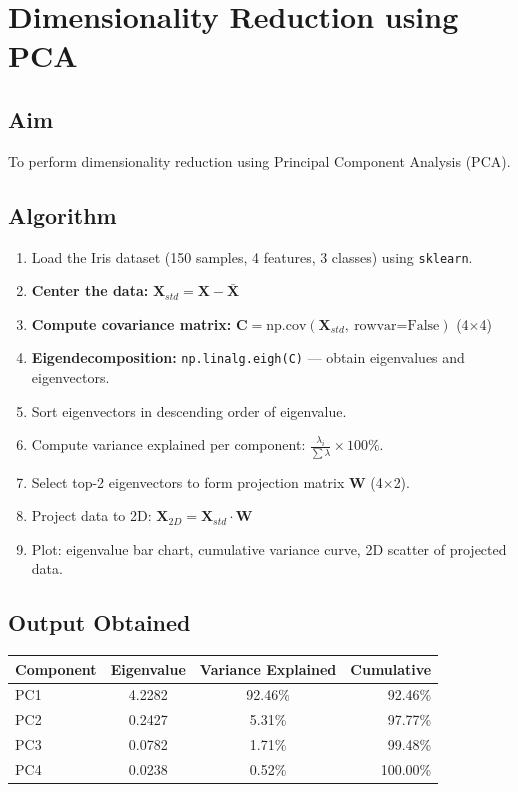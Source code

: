 \documentclass[12pt,a4paper]{article}
\begin{document}
\newpage

\section{Dimensionality Reduction using PCA}

\subsection*{Aim}
To perform dimensionality reduction using Principal Component Analysis (PCA).

\subsection*{Algorithm}
\begin{enumerate}[leftmargin=*, label=\arabic*.]
  \item Load the Iris dataset (150 samples, 4 features, 3 classes) using \texttt{sklearn}.
  \item \textbf{Center the data:} $\mathbf{X}_{std} = \mathbf{X} - \bar{\mathbf{X}}$
  \item \textbf{Compute covariance matrix:} $\mathbf{C} = \text{np.cov}(\mathbf{X}_{std},\ \text{rowvar=False})$ \quad (4$\times$4)
  \item \textbf{Eigendecomposition:} \texttt{np.linalg.eigh(C)} --- obtain eigenvalues and eigenvectors.
  \item Sort eigenvectors in descending order of eigenvalue.
  \item Compute variance explained per component: $\frac{\lambda_i}{\sum \lambda} \times 100\%$.
  \item Select top-2 eigenvectors to form projection matrix $\mathbf{W}$ (4$\times$2).
  \item Project data to 2D: $\mathbf{X}_{2D} = \mathbf{X}_{std} \cdot \mathbf{W}$
  \item Plot: eigenvalue bar chart, cumulative variance curve, 2D scatter of projected data.
\end{enumerate}

\subsection*{Output Obtained}

\begin{center}
\begin{tabular}{lccr}
\toprule
\textbf{Component} & \textbf{Eigenvalue} & \textbf{Variance Explained} & \textbf{Cumulative} \\
\midrule
PC1 & 4.2282 & 92.46\% & 92.46\% \\
PC2 & 0.2427 &  5.31\% & 97.77\% \\
PC3 & 0.0782 &  1.71\% & 99.48\% \\
PC4 & 0.0238 &  0.52\% & 100.00\% \\
\bottomrule
\end{tabular}
\end{center}
\end{document}
